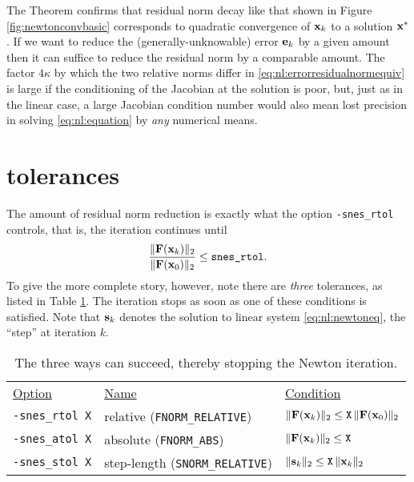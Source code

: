 The Theorem confirms that residual norm decay like that shown in Figure \ref{fig:newtonconvbasic} corresponds to quadratic convergence of $\mathbf{x}_k$ to a solution $\mathbf{x}^*$.  If we want to reduce the (generally-unknowable) error $\mathbf{e}_k$ by a given amount then it can suffice to reduce the residual norm by a comparable amount.  The factor $4 \kappa$ by which the two relative norms differ in \eqref{eq:nl:errorresidualnormequiv} is large if the conditioning of the Jacobian at the solution is poor, but, just as in the linear case, a large Jacobian condition number would also mean lost precision in solving \eqref{eq:nl:equation} by \emph{any} numerical means.


\section{\pSNES tolerances}

The amount of residual norm reduction is exactly what the option \texttt{-snes\_rtol} controls, that is, the iteration continues until
    $$\frac{\|\mathbf{F}(\mathbf{x}_k)\|_2}{\|\mathbf{F}(\mathbf{x}_0)\|_2} \le \text{\texttt{snes\_rtol}}.$$
To give the more complete story, however, note there are \emph{three} \pSNES tolerances, as listed in Table \ref{tab:snestolerances}.  The iteration stops as soon as one of these conditions is satisfied.  Note that $\mathbf{s}_k$ denotes the solution to linear system \eqref{eq:nl:newtoneq}, the ``step'' at iteration $k$.

\medskip
\begin{table}
\begin{tabular}{lll}
\underline{Option}\hspace{0.2in} & \underline{Name}\hspace{0.2in} & \underline{Condition}\hspace{0.2in} \\
\texttt{-snes\_rtol X} & relative (\texttt{FNORM\_RELATIVE}) & $\|\mathbf{F}(\mathbf{x}_k)\|_2 \le \text{\texttt{X}}\, \|\mathbf{F}(\mathbf{x}_0)\|_2$ \\
\texttt{-snes\_atol X} & absolute (\texttt{FNORM\_ABS}) & $\|\mathbf{F}(\mathbf{x}_k)\|_2 \le \text{\texttt{X}}$ \\
\texttt{-snes\_stol X} & step-length (\texttt{SNORM\_RELATIVE}) & $\|\mathbf{s}_k\|_2 \le \text{\texttt{X}}\, \|\mathbf{x}_k\|_2$
\end{tabular}
\caption{The three ways \pSNES can succeed, thereby stopping the Newton iteration.} \label{tab:snestolerances}
\end{table}

